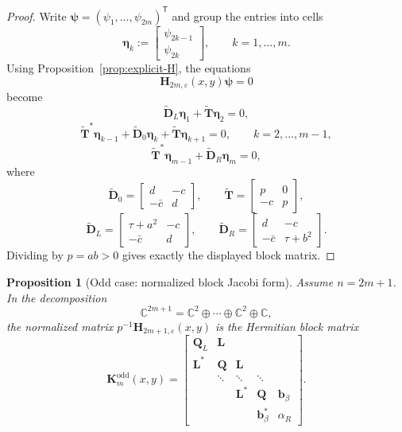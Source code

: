 \documentclass[11pt]{article}
\newtheorem{proposition}[theorem]{Proposition}
\begin{document}
\begin{proof}
Write \(\boldsymbol{\psi}=(\psi_1,\dots,\psi_{2m})^{\mathsf T}\) and group the entries into cells
\[
\boldsymbol{\eta}_k:=
\begin{bmatrix}
\psi_{2k-1}\\
\psi_{2k}
\end{bmatrix},
\qquad k=1,\dots,m.
\]
Using Proposition~\ref{prop:explicit-H}, the equations
\[
\mathbf{H}_{2m,\varepsilon}(x,y)\boldsymbol{\psi}=0
\]
become
\[
\widetilde{\mathbf{D}}_L\boldsymbol{\eta}_1+\widetilde{\mathbf{T}}\boldsymbol{\eta}_2=0,
\]
\[
\widetilde{\mathbf{T}}^*\boldsymbol{\eta}_{k-1}+\widetilde{\mathbf{D}}_0\boldsymbol{\eta}_k+\widetilde{\mathbf{T}}\boldsymbol{\eta}_{k+1}=0,
\qquad k=2,\dots,m-1,
\]
\[
\widetilde{\mathbf{T}}^*\boldsymbol{\eta}_{m-1}+\widetilde{\mathbf{D}}_R\boldsymbol{\eta}_m=0,
\]
where
\[
\widetilde{\mathbf{D}}_0=
\begin{bmatrix}
d&-c\\
-\bar c&d
\end{bmatrix},
\qquad
\widetilde{\mathbf{T}}=
\begin{bmatrix}
p&0\\
-c&p
\end{bmatrix},
\]
\[
\widetilde{\mathbf{D}}_L=
\begin{bmatrix}
\tau+a^2&-c\\
-\bar c&d
\end{bmatrix},
\qquad
\widetilde{\mathbf{D}}_R=
\begin{bmatrix}
d&-c\\
-\bar c&\tau+b^2
\end{bmatrix}.
\]
Dividing by \(p=ab>0\) gives exactly the displayed block matrix.
\end{proof}

\begin{proposition}[Odd case: normalized block Jacobi form]\label{prop:odd-normalized-block-Jacobi}
Assume \(n=2m+1\). In the decomposition
\[
\mathbb{C}^{2m+1}
=
\mathbb{C}^2\oplus\cdots\oplus\mathbb{C}^2\oplus\mathbb{C},
\]
the normalized matrix \(p^{-1}\mathbf{H}_{2m+1,\varepsilon}(x,y)\) is the Hermitian block matrix
\[
\mathbf{K}_m^{\mathrm{odd}}(x,y)=
\begin{bmatrix}
\mathbf{Q}_L & \mathbf{L} \\
\mathbf{L}^* & \mathbf{Q} & \mathbf{L} \\
& \ddots & \ddots & \ddots \\
&& \mathbf{L}^* & \mathbf{Q} & \mathbf{b}_\beta \\
&&& \mathbf{b}_\beta^* & \alpha_R
\end{bmatrix}.
\]
\end{proposition}
\end{document}
